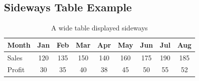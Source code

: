 \documentclass[12pt, a4paper]{article}
\begin{document}
\begin{english}

\section*{Sideways Table Example}

\begin{table}
  \centering
  \caption{A wide table displayed sideways}
  \begin{tabular}{lcccccccc}
    \toprule
    Month  & Jan & Feb & Mar & Apr & May & Jun & Jul & Aug \\
    \midrule
    Sales  & 120 & 135 & 150 & 140 & 160 & 175 & 190 & 185 \\
    Profit & 30  & 35  & 40  & 38  & 45  & 50  & 55  & 52  \\
    \bottomrule
  \end{tabular}
\end{table}

\end{english}
\end{document}
